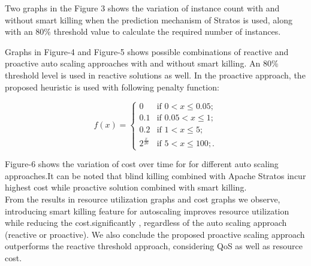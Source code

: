 Two graphs in the Figure 3 shows the variation of instance count with and without smart killing when the prediction mechanism of Stratos is used, along with an 80\% threshold value to calculate the required number of instances.

Graphs in Figure-4  and Figure-5 shows possible combinations of reactive and proactive auto scaling approaches with and without smart killing. An 80\% threshold level is used in reactive solutions as well. In the proactive approach, the proposed heuristic is used with following penalty function:

$$f(x) = \begin{cases} 
0 & \text{if $0 < x \le 0.05$}; \\
0.1 & \text{if $0.05 < x \le 1$}; \\
0.2 & \text{if $1 < x \le 5$};\\
2^{\frac{x}{20}} & \text{if $5 < x \le 100$};.\end{cases} $$


Figure-6 shows the variation of cost over time for for different auto scaling approaches.It can be noted that blind killing combined with Apache Stratos incur highest cost while proactive solution combined with smart killing.\\

From the results in resource utilization graphs and cost graphs we observe, introducing smart killing feature for autoscaling  improves resource utilization while reducing the cost.significantly , regardless of the auto scaling approach (reactive or proactive). We also conclude the proposed proactive scaling approach outperforms the reactive threshold approach, considering QoS as well as resource cost.
